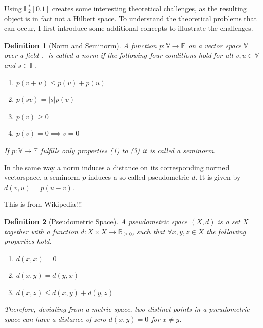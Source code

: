 \documentclass[12pt, a4paper]{article}
\theoremstyle{MAstyle} \newtheorem{assumption}{Assumption}[section]
\theoremstyle{MAstyle} \newtheorem{definition}{Definition}[section]
\theoremstyle{MAstyle} \newtheorem{theorem}{Theorem}[section]
\begin{document}
		Using $\mathbb{L}^{*}_2[0.1]$ creates some interesting theoretical challenges, as the resulting object is in fact not a Hilbert space. To understand the theoretical problems that can occur, I first introduce some additional concepts to illustrate the challenges.
		\begin{definition}[Norm and Seminorm]
			A function $p : \mathbb{V} \rightarrow \mathbb{F}$ on a vector space $\mathbb{V}$ over a field $\mathbb{F}$ is called a norm if the following four conditions hold for all $v,u \in \mathbb{V}$ and $s \in \mathbb{F}$.
			\begin{multicols}{2}
				\begin{enumerate}
					\item $p(v + u) \leq p(v) + p(u)$
					\item $p(sv) = |s| p(v)$
					\item $p(v) \geq 0$
					\item $p(v) = 0 \implies v = 0$
				\end{enumerate}
			\end{multicols}
			If $p : \mathbb{V} \rightarrow \mathbb{F}$ fulfills only properties (1) to (3) it is called a seminorm.
		\end{definition}
		
		In the same way a norm induces a distance on its corresponding normed vectorspace, a seminorm $p$ induces a so-called pseudometric $d$. It is given by $d(v,u) = p(u-v)$.
		
		{\color{red} This is from Wikipedia!!!}
		\begin{definition}[Pseudometric Space]
			A pseudometric space $\left(X, d\right)$ is a set $X$ together with a function $d:X\times X \rightarrow \mathbb{R}_{\geq 0}$, such that $\forall x,y,z \in X$ the following properties hold.
			\begin{multicols}{2}
				\begin{enumerate}
					\item $d(x,x) = 0$
					\item $d(x,y) = d(y,x)$
					\item $d(x,z) \leq d(x,y) + d(y,z)$
				\end{enumerate}
			\end{multicols}
			Therefore, deviating from a metric space, two distinct points in a pseudometric space can have a distance of zero $d(x,y) = 0$ for $x \neq y$.
		\end{definition}
		
\end{document}
